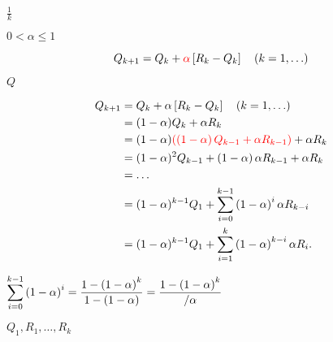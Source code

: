 \documentclass[10pt]{book}
\begin{document}
\begin{mdSnippets}
\begin{mdInlineSnippet}[691075217eb13799c1fc2c5ae2f3b215]%
$\frac{1}{k}$\end{mdInlineSnippet}%
\begin{mdInlineSnippet}[bf806ccfe8e86b4695f81d1af3ee046b]%
$0 <\alpha \leq 1$\end{mdInlineSnippet}%
\begin{mdDisplaySnippet}[1056b49c389f329aa66490ea407de5f2]%
\[%
Q_{k+1} = Q_k + \textcolor{red}{\alpha} \sqbra{R_k - Q_k} \quad \paren{k=1, \dots }
\]%
\end{mdDisplaySnippet}%
\begin{mdInlineSnippet}[f09564c9ca56850d4cd6b3319e541aee]%
$Q$\end{mdInlineSnippet}%
\begin{mdDisplaySnippet}[29316d394441738a51a5dde57c62d58e]%
\[%
\begin{aligned}
Q_{k+1} &= Q_k + \alpha \sqbra{R_k - Q_k} \quad \paren{k=1, \dots }\\
&= (1-\alpha)Q_k + \alpha R_k\\
&= (1-\alpha)\textcolor{red}{\paren{\paren{1-\alpha}Q_{k-1} + \alpha R_{k-1}} }+ \alpha R_k\\
&= (1-\alpha)^2 Q_{k-1} + \paren{1-\alpha}\alpha R_{k-1} + \alpha R_k\\
&= \dots\\
&= (1-\alpha)^{k-1} Q_{1} +  \sum_{i=0}^{k-1}\paren{1-\alpha}^i \alpha R_{k-i}\\
&= (1-\alpha)^{k-1} Q_{1} +  \sum_{i=1}^{k}\paren{1-\alpha}^{k-i} \alpha R_{i}.
\end{aligned}
\]%
\end{mdDisplaySnippet}%
\begin{mdInlineSnippet}[e61c6b2966d98db18cb5a378d991eb5d]%
$\displaystyle\sum_{i=0}^{k-1}\left( {1-\alpha} \right)^i = \frac{1 - \left( {1-\alpha} \right)^k}{1 - \left( {1-\alpha} \right) } = \frac{1- \left( {1-\alpha} \right)^k}{/\alpha}$\end{mdInlineSnippet}%
\begin{mdInlineSnippet}[1a43913bee1eb714983a7283b1ed20c5]%
$Q_1, R_1, \dots, R_k$\end{mdInlineSnippet}%
\begin{mdDisplaySnippet}[7080414a6c853398713420945d15c0c0]%
\[%
\]
\end{mdDisplaySnippet}
\end{mdSnippets}
\end{document}
